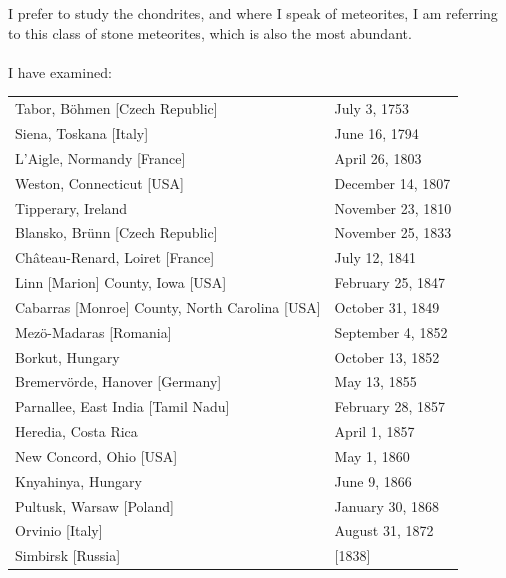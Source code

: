 \documentclass[a4paper, 12pt, oneside]{article}
\begin{document}
I prefer to study the chondrites, and where I speak of meteorites, I am referring to this class of stone meteorites, which is also the most abundant.
\paragraph*{}
I have examined:
\begin{center}
\tiny
\begin{tabular}{ p{3.5cm} p{2.4cm} }
 Tabor, Böhmen [Czech Republic] & July 3, 1753\index{meteorite!Tabor} \\
 Siena, Toskana [Italy] & June 16, 1794\index{meteorite!Siena} \\
 L'Aigle, Normandy [France] & April 26, 1803\index{meteorite!L'Aigle} \\
 Weston, Connecticut [USA] & December 14, 1807\index{meteorite!Weston} \\
 Tipperary, Ireland & November 23, 1810\index{meteorite!Tipperary} \\
 Blansko, Brünn [Czech Republic] & November 25, 1833\index{meteorite!Blansko} \\
 Château-Renard, Loiret [France] & July 12, 1841\index{meteorite!Château-Renard} \\
 Linn [Marion] County, Iowa [USA] & February 25, 1847\index{meteorite!Marion County}\index{meteorite!Linn} \\
 Cabarras [Monroe] County, North Carolina [USA] & October 31, 1849\index{meteorite!Monroe County}\index{meteorite!Cabarras} \\
 Mezö-Madaras [Romania] & September 4, 1852\index{meteorite!Mezö-Madaras} \\
 Borkut, Hungary & October 13, 1852\index{meteorite!Borkut} \\
 Bremervörde, Hanover [Germany] & May 13, 1855\index{meteorite!Bremervörde} \\
 Parnallee, East India [Tamil Nadu] & February 28, 1857\index{meteorite!Parnallee} \\
 Heredia, Costa Rica & April 1, 1857\index{meteorite!Heredia} \\
 New Concord, Ohio [USA] & May 1, 1860\index{meteorite!New Concord} \\
 Knyahinya, Hungary & June 9, 1866\index{meteorite!Knyahinya} \\
 Pultusk, Warsaw [Poland] & January 30, 1868\index{meteorite!Pultusk} \\
 Orvinio [Italy] & August 31, 1872\index{meteorite!Orvinio} \\
 Simbirsk [Russia] & [1838]\index{meteorite!Simbirsk} \\
\end{tabular}
\end{center}
\clearpage
\end{document}
